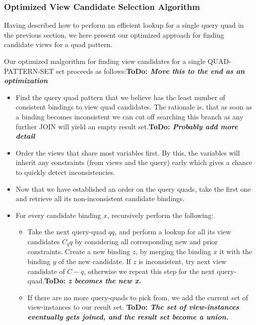 \documentclass[a4paper,twoside,bibtotoc,abstracton,12pt,BCOR=15mm]{scrreprt}
\newcommand{\todo}[1]{\textbf{ToDo: \textit{#1}}}
\begin{document}
\subsubsection{Optimized View Candidate Selection Algorithm}
Having described how to perform an efficient lookup for a single query quad in the previous section, we here present our optimized approach
for finding candidate views for a quad pattern. 

Our optimized malgorithm for finding view candidates for a single QUAD-PATTERN-SET set proceeds as follows:\todo{Move this to the end as an optimization}

\begin{itemize}
  \item  Find the query quad pattern that we believe has the least number of consistent bindings to view quad candidates.
  The rationale is, that as soon as a binding becomes inconsistent we can cut off searching this branch as any further JOIN will yield an empty result set.\todo{Probably add more detail} 
  \item Order the views that share most variables first. By this, the variables will inherit any constraints (from views and the query) early which gives a chance to quickly detect inconsistencies.   
  \item Now that we have established an order on the query quads, take the first one and retrieve all its non-inconsistent candidate bindings.
  \item For every candidate binding $x$, recursively perform the following:
  \begin{itemize}
    \item Take the next query-quad $qq$, and perform a lookup for all its view candidates $C_qq$ by considering all corresponding new and prior constraints.
    Create a new binding $z$, by merging the binding $x$ it with the binding $y$ of the new candidate. If $z$ is inconsistent, try next view candidate
    of $C-q$, otherwise we repeat this step for the next query-quad.\todo{z becomes the new x.}
  \item If there are no more query-quads to pick from, we add the current set of view-instances to our result set.
  \todo{The set of view-instances eventually gets joined, and the result set become a union.}
  \end{itemize}
\end{itemize}

  
\end{document}
